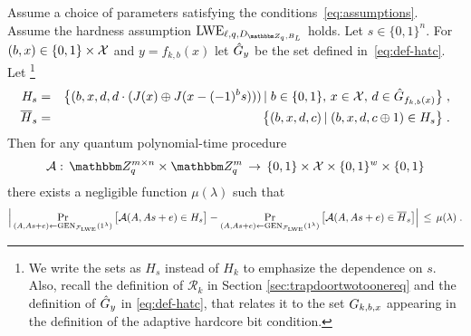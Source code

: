 \begin{lemma}\label{lem:lweadaptivehardcore} 
Assume a choice of parameters satisfying the conditions~\eqref{eq:assumptions}. Assume the hardness assumption $\lwe_{\ell,q,D_{\mZ_q,B_L}}$ holds. Let $s\in\{0,1\}^n$. For $(b,x)\in\{0,1\}\times\mathcal{X}$ and $y=f_{k,b}(x)$ let $ \hat{G}_{y}$ be the set defined in~\eqref{eq:def-hatc}. Let \footnote{We write the sets as $H_s$ instead of $H_k$ to emphasize the dependence on $s$. Also, recall the definition of $\mathcal{R}_k$ in Section \ref{sec:trapdoortwotoonereq} and the definition of $\hat{G}_{y}$ in \eqref{eq:def-hatc}, that relates it to the set $G_{k,b,x}$ appearing in the definition of the adaptive hardcore bit condition.}
\begin{eqnarray}
H_s &=& \big\{(b,x,d,d\cdot(\inj(x)\oplus \inj( x - (-1)^b \*s )))\,|\; b\in \{0,1\},\, x\in \sX,\, d\in \hat{\dset}_{f_{k,b}(x)}  \big\}\;,\label{eq:def-h}\\
\overline{H}_s &=& \big\{(b,x,d,c) \,|\; (b,x,d,c\oplus 1) \in H_s\big\}\;.
\end{eqnarray}
Then for any quantum polynomial-time procedure 
$$\mathcal{A}:\, \mZ_q^{m\times n} \times \mZ_q^m \,\to\,\{0,1\}\times \sX \times \{0,1\}^w \times\{0,1\}$$
 there exists a negligible function $\mu(\lambda)$ such that 
\begin{equation}\label{eq:lwebitattackeradvantage}
\Big|\Pr_{(\*A,\*A\*s+\*e)\leftarrow \textrm{GEN}_{\mathcal{F}_{\lwe}}(1^{\lambda})}\big[\mathcal{A}(\*A,\*A\*s+\*e) \in H_s\big] - \Pr_{(\*A,\*A\*s+\*e)\leftarrow \textrm{GEN}_{\mathcal{F}_{\lwe}}(1^{\lambda})}\big[\mathcal{A}(\*A,\*A\*s+\*e) \in \overline{H}_s\big]\Big| \,\leq\, \mu(\lambda)\;.
\end{equation} 
\end{lemma}

